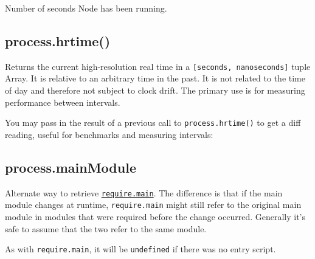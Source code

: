 Number of seconds Node has been running.

\subsection{process.hrtime()}\label{process.hrtime}

Returns the current high-resolution real time in a
\texttt{{[}seconds, nanoseconds{]}} tuple Array. It is relative to an
arbitrary time in the past. It is not related to the time of day and
therefore not subject to clock drift. The primary use is for measuring
performance between intervals.

You may pass in the result of a previous call to
\texttt{process.hrtime()} to get a diff reading, useful for benchmarks
and measuring intervals:

\begin{Shaded}
\end{Shaded}

\subsection{process.mainModule}\label{process.mainmodule}

Alternate way to retrieve
\href{modules.html\#modules_accessing_the_main_module}{\texttt{require.main}}.
The difference is that if the main module changes at runtime,
\texttt{require.main} might still refer to the original main module in
modules that were required before the change occurred. Generally it's
safe to assume that the two refer to the same module.

As with \texttt{require.main}, it will be \texttt{undefined} if there
was no entry script.
